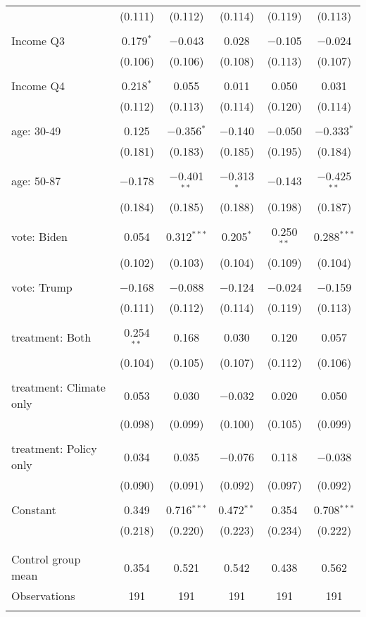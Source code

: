 \begin{tabular}{@{\extracolsep{5pt}}lccccc}
  & (0.111) & (0.112) & (0.114) & (0.119) & (0.113) \\ 
  & & & & & \\ 
 Income Q3 & 0.179$^{*}$ & $-$0.043 & 0.028 & $-$0.105 & $-$0.024 \\ 
  & (0.106) & (0.106) & (0.108) & (0.113) & (0.107) \\ 
  & & & & & \\ 
 Income Q4 & 0.218$^{*}$ & 0.055 & 0.011 & 0.050 & 0.031 \\ 
  & (0.112) & (0.113) & (0.114) & (0.120) & (0.114) \\ 
  & & & & & \\ 
 age: 30-49 & 0.125 & $-$0.356$^{*}$ & $-$0.140 & $-$0.050 & $-$0.333$^{*}$ \\ 
  & (0.181) & (0.183) & (0.185) & (0.195) & (0.184) \\ 
  & & & & & \\ 
 age: 50-87 & $-$0.178 & $-$0.401$^{**}$ & $-$0.313$^{*}$ & $-$0.143 & $-$0.425$^{**}$ \\ 
  & (0.184) & (0.185) & (0.188) & (0.198) & (0.187) \\ 
  & & & & & \\ 
 vote: Biden & 0.054 & 0.312$^{***}$ & 0.205$^{*}$ & 0.250$^{**}$ & 0.288$^{***}$ \\ 
  & (0.102) & (0.103) & (0.104) & (0.109) & (0.104) \\ 
  & & & & & \\ 
 vote: Trump & $-$0.168 & $-$0.088 & $-$0.124 & $-$0.024 & $-$0.159 \\ 
  & (0.111) & (0.112) & (0.114) & (0.119) & (0.113) \\ 
  & & & & & \\ 
 treatment: Both & 0.254$^{**}$ & 0.168 & 0.030 & 0.120 & 0.057 \\ 
  & (0.104) & (0.105) & (0.107) & (0.112) & (0.106) \\ 
  & & & & & \\ 
 treatment: Climate only & 0.053 & 0.030 & $-$0.032 & 0.020 & 0.050 \\ 
  & (0.098) & (0.099) & (0.100) & (0.105) & (0.099) \\ 
  & & & & & \\ 
 treatment: Policy only & 0.034 & 0.035 & $-$0.076 & 0.118 & $-$0.038 \\ 
  & (0.090) & (0.091) & (0.092) & (0.097) & (0.092) \\ 
  & & & & & \\ 
 Constant & 0.349 & 0.716$^{***}$ & 0.472$^{**}$ & 0.354 & 0.708$^{***}$ \\ 
  & (0.218) & (0.220) & (0.223) & (0.234) & (0.222) \\ 
  & & & & & \\ 
\hline \\[-1.8ex] 
Control group mean & 0.354 & 0.521 & 0.542 & 0.438 & 0.562 \\ 
Observations & 191 & 191 & 191 & 191 & 191 \\ 
\hline 
\hline \\[-1.8ex] 
\end{tabular} 
